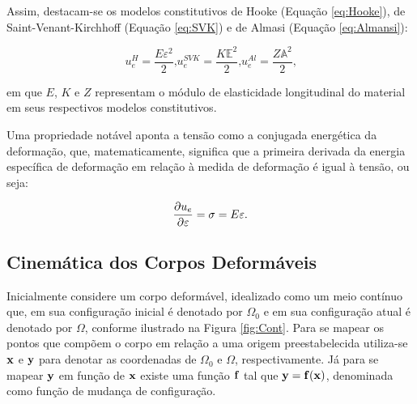 \documentclass[_ArquivoPrincipal.tex]{subfiles}
\begin{document}
Assim, destacam-se os modelos constitutivos de Hooke (Equação \ref{eq:Hooke}), de Saint-Venant-Kirchhoff (Equação \ref{eq:SVK}) e de Almasi (Equação \ref{eq:Almansi}):

\begin{subequations}
    \begin{equation}
        u_e^H=\frac{E\varepsilon^2}{2}\text{,}\label{eq:Hooke}
    \end{equation}
    \begin{equation}
        u_e^{SVK}=\frac{K\mathbb{E}^2}{2}\text{,}\label{eq:SVK}
    \end{equation}
    \begin{equation}
        u_e^{Al}=\frac{Z\mathbb{A}^2}{2}\text{,}\label{eq:Almansi}
    \end{equation}
\end{subequations}

\noindent em que $E$, $K$ e $Z$ representam o módulo de elasticidade longitudinal do material em seus respectivos modelos constitutivos.

Uma propriedade notável aponta a tensão como a conjugada energética da deformação, que, matematicamente, significa que a primeira derivada da energia específica de deformação em relação à medida de deformação é igual à tensão, ou seja:

\begin{equation}
    \frac{\partial{u_e}}{\partial{\varepsilon}}=\sigma=E\varepsilon\text{.}
\end{equation}

\subsection{Cinemática dos Corpos Deformáveis} \label{CCD}

Inicialmente considere um corpo deformável, idealizado como um meio contínuo que, em sua configuração inicial é denotado por $\Omega_0$ e em sua configuração atual é denotado por $\Omega$, conforme ilustrado na Figura \ref{fig:Cont}. Para se mapear os pontos que compõem o corpo em relação a uma origem preestabelecida utiliza-se $\mathbf{x}$ e $\mathbf{y}$ para denotar as coordenadas de $\Omega_0$ e $\Omega$, respectivamente. Já para se mapear $\mathbf{y}$ em função de $\mathbf{x}$ existe uma função $\mathbf{f}$ tal que $\mathbf{y}=\mathbf{f}(\mathbf{x})$, denominada como função de mudança de configuração.
\end{document}
